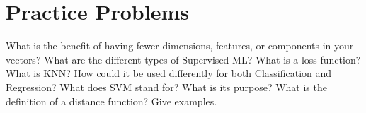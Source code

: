 \section{Practice Problems}

\begin{outline}[enumerate]
    \1 What is the benefit of having fewer dimensions, features, or components in your vectors?
    \1 What are the different types of Supervised ML?
    \1 What is a loss function?
    \1 What is KNN? How could it be used differently for both Classification and Regression?
    \1 What does SVM stand for? What is its purpose?
    \1 What is the definition of a distance function? Give examples.
\end{outline}


